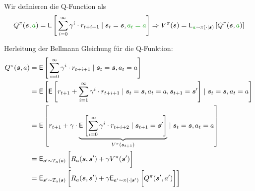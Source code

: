 \begin{definition}[Q-Function]
    Wir definieren die Q-Function als
    \begin{align*}
        Q^{\pi}(\bm{s}, \gruen{a}) 
        =
        \mathsf{E}
        \left[
            \vphantom{\int}
            \sum_{i=0}^{\infty} \gamma^i \cdot r_{t+i+1} 
            \mid \bm{s}_t = \bm{s}, \gruen{a_t = a}
        \right]
        \Rightarrow
        V^{\pi}(\bm{s})
        =
        \mathsf{E}_{\gruen{a} \sim \pi(\cdot|\bm{s})}
        \left[
            Q^{\pi}(\bm{s}, \gruen{a})
        \right]
    \end{align*}    
\end{definition}

Herleitung der Bellmann Gleichung für die Q-Funktion:
\begin{align*}
    Q^{\pi}(\bm{s}, a) 
    &= 
    \mathsf{E}
    \left[
        \vphantom{\int}
        \sum_{i=0}^{\infty} \gamma^i \cdot r_{t+i+1} 
        \mid \bm{s}_t = \bm{s}, a_t = a
    \right] \\
    &=
    \mathsf{E}
    \left[  
        \mathsf{E}
        \left[
            r_{t+1} + \sum_{i=1}^{\infty} \gamma^i \cdot r_{t+i+1} 
            \mid \bm{s}_t = \bm{s}, a_t = a, \bm{s}_{t+1} = \bm{s}'
            \right]
            \mid \bm{s}_t = \bm{s}, a_t = a
        \right] \\
        &= 
        \mathsf{E}
        \left[
            r_{t+1} + \gamma \cdot 
            \underbrace{
                \mathsf{E}
                \left[
                    \sum_{i=0}^{\infty} \gamma^{i} 
                    \cdot r_{t+i+2} \mid \bm{s}_{t+1} = \bm{s}'
                \right]
            }_{
                V^{\pi}(\bm{s}_{t+1})
            } 
            \mid \bm{s}_t = \bm{s}, a_t = a
        \right] \\
        &= 
        \mathsf{E}_{\bm{s}' \sim T_a(\bm{s})}
        \left[
            \vphantom{\int}
            R_a(\bm{s}, \bm{s}') + \gamma V^{\pi}(\bm{s}') 
        \right]
        \\
        &= 
        \mathsf{E}_{\bm{s}' \sim T_a(\bm{s})}
        \left[
            \vphantom{\int}
            R_a(\bm{s}, \bm{s}') + \gamma 
            \mathsf{E}_{a' \sim \pi(\cdot|\bm{s}')}
            \left[
                \vphantom{\int}
                Q^{\pi}(\bm{s}', a')
            \right]
        \right]
\end{align*}

